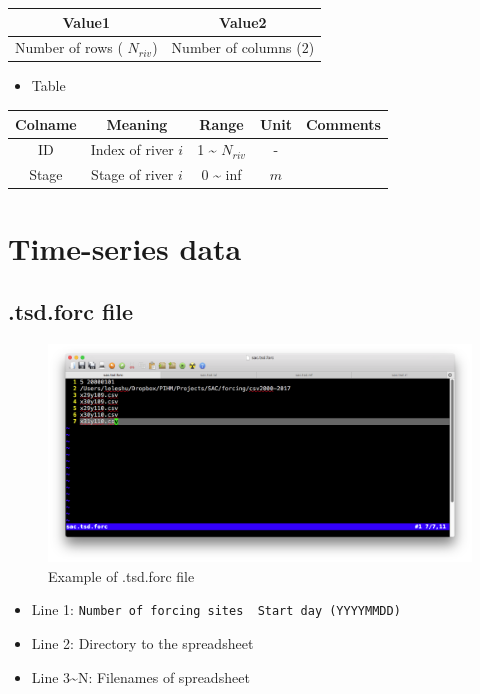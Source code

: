 \documentclass[
]{scrbook}
\providecommand{\tightlist}{%
  \setlength{\itemsep}{0pt}\setlength{\parskip}{0pt}}
\begin{document}
\begin{longtable}[]{@{}cc@{}}
\toprule
Value1 & Value2\tabularnewline
\midrule
\endhead
Number of rows ( \(N_{riv}\)) & Number of columns (\(2\))\tabularnewline
\bottomrule
\end{longtable}

\begin{itemize}
\tightlist
\item
  Table
\end{itemize}

\begin{longtable}[]{@{}ccccc@{}}
\toprule
Colname & Meaning & Range & Unit & Comments\tabularnewline
\midrule
\endhead
ID & Index of river \(i\) & 1 \textasciitilde{} \(N_{riv}\) & - &\tabularnewline
Stage & Stage of river \(i\) & 0 \textasciitilde{} inf & \(m\) &\tabularnewline
\bottomrule
\end{longtable}

\hypertarget{time-series-data}{%
\section{Time-series data}\label{time-series-data}}

\hypertarget{tsd.forc-file}{%
\subsection{.tsd.forc file}\label{tsd.forc-file}}

\begin{figure}
\centering
\includegraphics{Fig/IO/tsd.forc.png}
\caption{Example of .tsd.forc file}
\end{figure}

\begin{itemize}
\tightlist
\item
  Line 1: \texttt{Number\ of\ forcing\ sites\ \textbar{}\ Start\ day\ (YYYYMMDD)}
\item
  Line 2: Directory to the spreadsheet
\item
  Line 3\textasciitilde N: Filenames of spreadsheet
\end{itemize}
\end{document}
